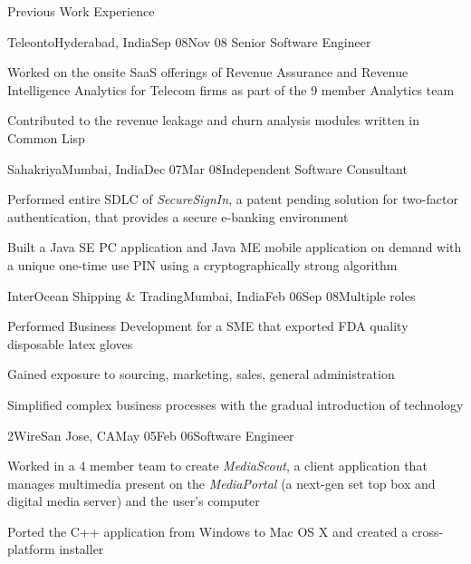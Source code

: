 \documentclass{resume} %
\begin{document}
\begin{rSection}{Previous Work Experience}

\begin{rSubsection}{Teleonto}{Hyderabad, India}{Sep 08}{Nov 08}
{Senior Software Engineer}
\item Worked on the onsite SaaS offerings of Revenue Assurance and Revenue Intelligence Analytics for Telecom firms as part of the 9 member Analytics team
\item Contributed to the revenue leakage and churn analysis modules written in Common Lisp
\end{rSubsection}


\begin{rSubsection}{Sahakriya}{Mumbai, India}{Dec 07}{Mar
    08}{Independent Software Consultant}
\item Performed entire SDLC of {\em SecureSignIn}, a patent pending solution for two-factor authentication, that provides a secure e-banking environment
\item Built a Java SE PC application and Java ME mobile application on demand with a unique one-time use PIN using a cryptographically strong algorithm
\end{rSubsection}


\begin{rSubsection}{InterOcean Shipping \& Trading}{Mumbai, India}{Feb 06}{Sep 08}{Multiple roles}
\item Performed Business Development for a SME that exported FDA quality disposable latex gloves
\item Gained exposure to sourcing, marketing, sales, general administration
\item Simplified complex business processes with the gradual introduction of technology
\end{rSubsection}



\begin{rSubsection}{2Wire}{San Jose, CA}{May 05}{Feb 06}{Software Engineer}
\item Worked in a 4 member team to create {\em MediaScout}, a client
  application that manages multimedia present on the {\em MediaPortal}
  (a next-gen set top box and digital media server) and the user's computer
\item Ported the C++ application from Windows to Mac OS X and created a cross-platform installer
\end{rSubsection}

\end{rSection}
\end{document}
